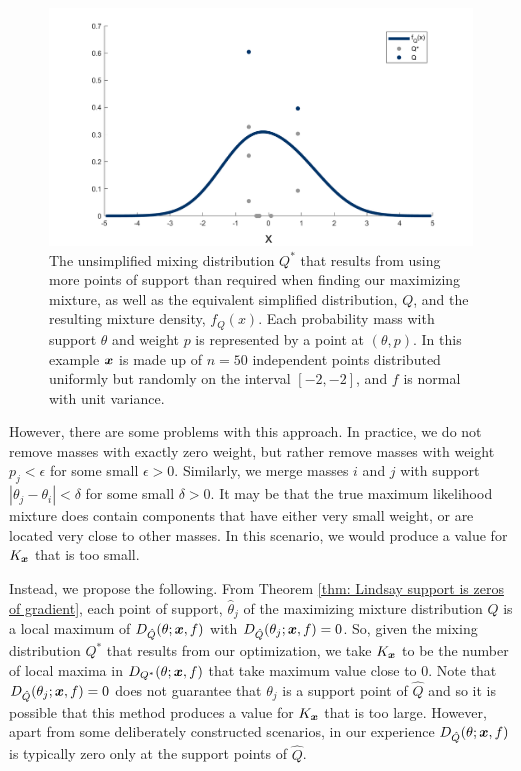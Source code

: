 	\begin{figure}
		\centering
		\includegraphics[width = \textwidth]{Figures/Mixtures/collapsing_distribution.png}
		\caption[The unsimplified mixing distribution $Q^*$ that results from using more points of support than required when finding our maximizing mixture, as well as the equivalent simplified distribution, $Q$, and the resulting mixture density, $f_Q(x)$.]{The unsimplified mixing distribution $Q^*$ that results from using more points of support than required when finding our maximizing mixture, as well as the equivalent simplified distribution, $Q$, and the resulting mixture density, $f_Q(x)$. Each probability mass with support $\theta$ and weight $p$ is represented by a point at $(\theta, p)$. In this example ${\bm{{x}}}$ is made up of $n = 50$ independent points distributed uniformly but randomly on the interval $[-2,-2]$, and $f$ is normal with unit variance.}
		\label{fig:collapsing distribution}
	\end{figure}

	However, there are some problems with this approach. In practice, we do not remove masses with exactly zero weight, but rather remove masses with weight $p_j < \epsilon$ for some small $\epsilon > 0$. Similarly, we merge masses $i$ and $j$ with support $|\theta_j - \theta_i| < \delta$ for some small $\delta > 0$. It may be that the true maximum likelihood mixture does contain components that have either very small weight, or are located very close to other masses. In this scenario, we would produce a value for $K_{\bm{{x}}}$ that is too small.

	Instead, we propose the following. From Theorem \ref{thm: Lindsay support is zeros of gradient}, each point of support, $\hat{\theta}_j$ of the maximizing mixture distribution $\hat{Q}$ is a local maximum of $D_{\hat{Q}}(\theta;{\bm{{x}}}, f)$ with $D_{\hat{Q}}(\theta_j;{\bm{{x}}},f) = 0$. So, given the mixing distribution $Q^*$ that results from our optimization, we take $K_{\bm{{x}}}$ to be the number of local maxima in $D_{Q^*}(\theta;{\bm{{x}}}, f)$ that take maximum value close to $0$. Note that $D_{\hat{Q}}(\theta_j; {\bm{{x}}}, f) = 0$ does not guarantee that $\theta_j$ is a support point of $\hat{Q}$ and so it is possible that this method produces a value for $K_{\bm{{x}}}$ that is too large. However, apart from some deliberately constructed scenarios, in our experience $D_{\hat{Q}}(\theta;{\bm{{x}}}, f)$ is typically zero only at the support points of $\hat{Q}$.

